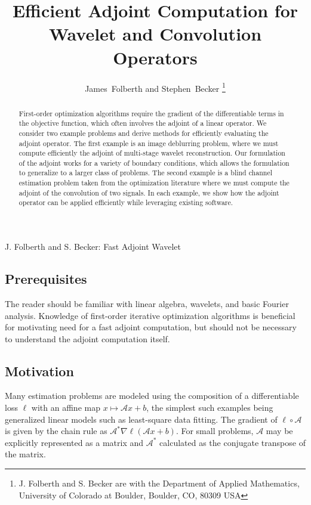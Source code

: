 \documentclass[journal]{IEEEtran}
\newcommand{\A}{\mathcal{A}}
\begin{document}
\title{Efficient Adjoint Computation for Wavelet and Convolution Operators}
\author{James~Folberth and 
        Stephen~Becker%
\thanks{J. Folberth and S. Becker are with the Department
of Applied Mathematics, University of Colorado at Boulder,
Boulder, CO, 80309 USA}}

%
{J. Folberth and S. Becker: Fast Adjoint Wavelet}

\maketitle

\begin{abstract}
   First-order optimization algorithms require the gradient of the differentiable terms in the objective function, which often involves the adjoint of a linear operator.  We consider two example problems and derive methods for efficiently evaluating the adjoint operator.  The first example is an image deblurring problem, where we must compute efficiently the adjoint of multi-stage wavelet reconstruction.  Our formulation of the adjoint works for a variety of boundary conditions, which allows the formulation to generalize to a larger class of problems.  The second example is a blind channel estimation problem taken from the optimization literature where we must compute the adjoint of the convolution of two signals.  In each example, we show how the adjoint operator can be applied efficiently while leveraging existing software.
\end{abstract}

\subsection*{Prerequisites}
The reader should be familiar with linear algebra, wavelets, and basic Fourier analysis.  Knowledge of first-order iterative optimization algorithms is beneficial for motivating need for a fast adjoint computation, but should not be necessary to understand the adjoint computation itself.\\

\subsection*{Motivation}
Many estimation problems are modeled using the composition of a differentiable loss $\ell$ with an affine map $x\mapsto\mathcal{A}x+b$, the simplest such examples being generalized linear models such as least-square data fitting. The gradient of $\ell \circ \A$ is given by the chain rule as $\mathcal{A}^* \nabla \ell( \A x + b)$. For small problems, $\A$ may be explicitly represented as a matrix and $\A^*$ calculated as the conjugate transpose of the matrix. 
\end{document}
